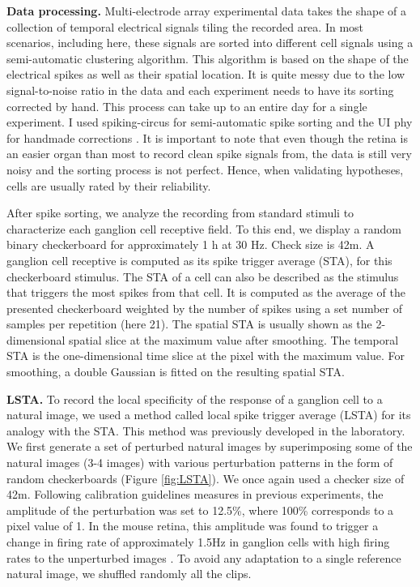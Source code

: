 \textbf{Data processing.}
Multi-electrode array experimental data takes the shape of a collection of
temporal electrical signals tiling the recorded area.
In most scenarios, including here, these signals are sorted into different cell
signals using a semi-automatic clustering algorithm. This algorithm is based on
the shape
of the electrical spikes as well as their spatial location. It is
quite messy due to the low signal-to-noise ratio in the data and each
experiment needs to have its sorting corrected by hand.
This process can take up to an
entire day for a single experiment. I used spiking-circus for semi-automatic
spike sorting and the UI phy for handmade corrections \citep{yger_spike_2018}.
It is important to note that even though the retina is an easier organ than
most to record clean spike signals from, the data is still very noisy and the
sorting process is not perfect. Hence, when validating hypotheses, cells are
usually rated by their reliability.

After spike sorting, we analyze the recording from standard stimuli to
characterize each
ganglion cell receptive field. To this end, we display a random binary
checkerboard for approximately 1 h at 30 Hz. Check size is 42\textmu m. A
ganglion cell receptive is computed as its spike trigger average (STA), for
this checkerboard stimulus. The STA of a cell can also be described as the
stimulus that triggers the most spikes from that cell. It is computed as the
average of the presented checkerboard weighted by the number of spikes using a
set number of samples per repetition (here 21). The spatial STA is usually
shown as the 2-dimensional spatial slice at the maximum value after smoothing.
The temporal STA is the one-dimensional time slice at the pixel with the
maximum
value. For smoothing, a double Gaussian is fitted on the resulting spatial
STA.


\textbf{LSTA.}
To record the local specificity of the response of a ganglion cell to a natural
image, we used a method called local spike trigger average (LSTA) for its
analogy with the STA. This method was previously developed in the laboratory.
We first generate a set of perturbed natural images by superimposing some of
the natural images (3-4 images) with various perturbation patterns in the form
of random checkerboards (Figure \ref{fig:LSTA}). We once again used a checker
size of 42\textmu m.
Following calibration guidelines measures in previous experiments, the
amplitude of the perturbation was set to 12.5\%, where 100\% corresponds to a
pixel value of 1. In the mouse retina, this amplitude was found to trigger a
change in firing rate of approximately 1.5Hz in ganglion cells with high firing
rates to the unperturbed images \citep{goldin_context-dependent_2022}. To avoid
any adaptation to a single reference natural image, we shuffled randomly all
the clips.

